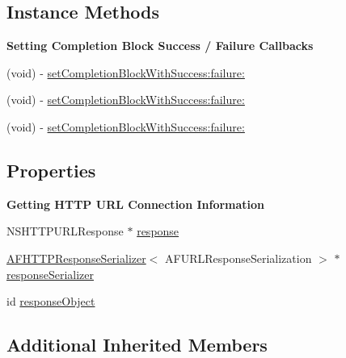 \subsection*{Instance Methods}
\begin{Indent}\textbf{ Setting Completion Block Success / Failure Callbacks}\par
{\em 

 

 }\begin{DoxyCompactItemize}
\item 
(void) -\/ \mbox{\hyperlink{interface_a_f_h_t_t_p_request_operation_a3b816391726dade9cfc9cbc11cc352d6}{set\+Completion\+Block\+With\+Success\+:failure\+:}}
\item 
(void) -\/ \mbox{\hyperlink{interface_a_f_h_t_t_p_request_operation_a3b816391726dade9cfc9cbc11cc352d6}{set\+Completion\+Block\+With\+Success\+:failure\+:}}
\item 
(void) -\/ \mbox{\hyperlink{interface_a_f_h_t_t_p_request_operation_a3b816391726dade9cfc9cbc11cc352d6}{set\+Completion\+Block\+With\+Success\+:failure\+:}}
\end{DoxyCompactItemize}
\end{Indent}
\subsection*{Properties}
\begin{Indent}\textbf{ Getting H\+T\+TP U\+RL Connection Information}\par
{\em 

 

 }\begin{DoxyCompactItemize}
\item 
N\+S\+H\+T\+T\+P\+U\+R\+L\+Response $\ast$ \mbox{\hyperlink{interface_a_f_h_t_t_p_request_operation_abfa028f296bc36526a873bd49df9dafa}{response}}
\item 
\mbox{\hyperlink{interface_a_f_h_t_t_p_response_serializer}{A\+F\+H\+T\+T\+P\+Response\+Serializer}}$<$ A\+F\+U\+R\+L\+Response\+Serialization $>$ $\ast$ \mbox{\hyperlink{interface_a_f_h_t_t_p_request_operation_a5b07813a0ff6ba379c5f98a9fb87b5a7}{response\+Serializer}}
\item 
id \mbox{\hyperlink{interface_a_f_h_t_t_p_request_operation_a7418f7784dcaf21623ce588fb27734c3}{response\+Object}}
\end{DoxyCompactItemize}
\end{Indent}
\subsection*{Additional Inherited Members}


